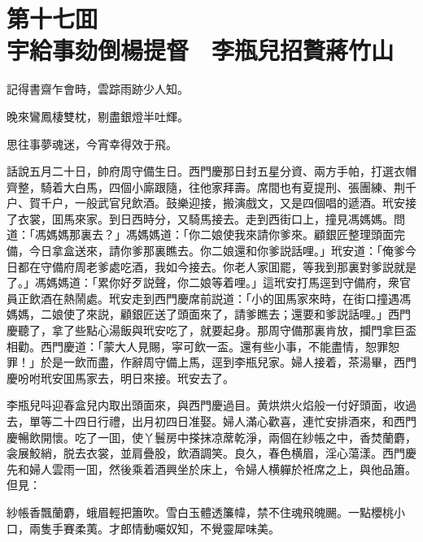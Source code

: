 
\chapter*{第十七囬　\\宇給事劾倒楊提督　李瓶兒招贅蔣竹山}
\thispagestyle{empty}

\begin{myquote}
記得書齋乍會時，雲踪雨跡少人知。

晚來鸞鳳棲雙枕，剔盡銀燈半吐輝。

思往事夢魂迷，今宵幸得效于飛。
\end{myquote}

話說五月二十日，帥府周守備生日。西門慶那日封五星分資、兩方手帕，打選衣帽齊整，騎着大白馬，四個小廝跟隨，往他家拜壽。席間也有夏提刑、張團練、荆千户、賀千户，一般武官兒飲酒。鼓樂迎接，搬演戲文，又是四個唱的遞酒。玳安接了衣裳，囬馬來家。到日西時分，又騎馬接去。走到西街口上，撞見馮媽媽。問道：「馮媽媽那裏去？」馮媽媽道：「你二娘使我來請你爹來。顧銀匠整理頭面完備，今日拿盒送來，請你爹那裏瞧去。你二娘還和你爹説話哩。」玳安道：「俺爹今日都在守備府周老爹處吃酒，我如今接去。你老人家囬罷，等我到那裏對爹説就是了。」馮媽媽道：「累你好歹説聲，你二娘等着哩。」這玳安打馬逕到守備府，衆官員正飲酒在熱鬧處。玳安走到西門慶席前説道：「小的囬馬家來時，在街口撞遇馮媽媽，二娘使了來説，顧銀匠送了頭面來了，請爹瞧去；還要和爹説話哩。」西門慶聽了，拿了些點心湯飯與玳安吃了，就要起身。那周守備那裏肯放，攔門拿巨盃相勸。西門慶道：「蒙大人見賜，寜可飲一盃。還有些小事，不能盡情，恕罪恕罪！」於是一飲而盡，作辭周守備上馬，逕到李瓶兒家。婦人接着，茶湯畢，西門慶吩咐玳安囬馬家去，明日來接。玳安去了。

李瓶兒呌迎春盒兒内取出頭面來，與西門慶過目。黄烘烘火焰般一付好頭面，收過去，單等二十四日行禮，出月初四日准娶。婦人滿心歡喜，連忙安排酒來，和西門慶暢飲開懷。吃了一囬，使丫鬟房中搽抹凉蓆乾淨，兩個在紗帳之中，香焚蘭麝，衾展鮫綃，脱去衣裳，並肩疊股，飲酒調笑。良久，春色横眉，淫心蕩漾。西門慶先和婦人雲雨一囬，然後乘着酒興坐於床上，令婦人横軃於袵席之上，與他品簫。但見：

\begin{myquote}
紗帳香飄蘭麝，蛾眉輕把簫吹。雪白玉體透簾幃，禁不住魂飛魄颺。一點櫻桃小口，兩隻手賽柔荑。才郎情動囑奴知，不覺靈犀味美。
\end{myquote}

